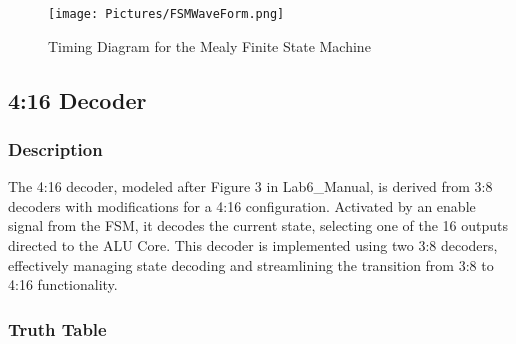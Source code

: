 		\begin{figure}[H]
			\centering
			\texttt{[image: Pictures/FSMWaveForm.png]}
			\caption{{Timing Diagram for the Mealy Finite State Machine}}
			\label{}
		\end{figure}

\subsection{{4:16 Decoder}}

	\subsubsection{{Description}}
	
		{The 4:16 decoder, modeled after Figure 3 in Lab6\_Manual, is derived from 3:8 decoders with modifications for a 4:16 configuration. Activated by an enable signal from the FSM, it decodes the current state, selecting one of the 16 outputs directed to the ALU Core. This decoder is implemented using two 3:8 decoders, effectively managing state decoding and streamlining the transition from 3:8 to 4:16 functionality.}
	
	\subsubsection{{Truth Table}}
	

